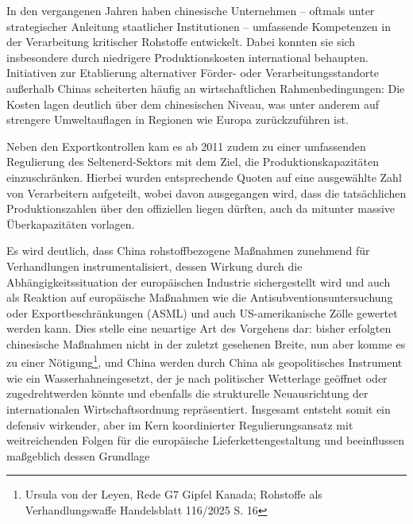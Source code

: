 \documentclass[12pt,a4paper,oneside]{book} %
\begin{document}
In den vergangenen Jahren haben chinesische Unternehmen -- oftmals unter strategischer Anleitung staatlicher Institutionen – umfassende Kompetenzen in der Verarbeitung kritischer Rohstoffe entwickelt. Dabei konnten sie sich insbesondere durch niedrigere Produktionskosten international behaupten. Initiativen zur Etablierung alternativer Förder- oder Verarbeitungsstandorte außerhalb Chinas scheiterten häufig an wirtschaftlichen Rahmenbedingungen: Die Kosten lagen deutlich über dem chinesischen Niveau, was unter anderem auf strengere Umweltauflagen in Regionen wie Europa zurückzuführen ist.

Neben den Exportkontrollen kam es ab 2011 zudem zu einer umfassenden Regulierung des Seltenerd-Sektors mit dem Ziel, die Produktionskapazitäten einzuschränken. Hierbei wurden entsprechende Quoten auf eine ausgewählte Zahl von Verarbeitern aufgeteilt, wobei davon ausgegangen wird, dass die tatsächlichen Produktionszahlen über den offiziellen liegen dürften, auch da mitunter massive Überkapazitäten vorlagen.\autocite{Top Commodity News 57, S. 1ff}


Es wird deutlich, dass China rohstoffbezogene Maßnahmen zunehmend für Verhandlungen instrumentalisiert, dessen Wirkung durch die Abhängigkeitssituation der europäischen Industrie sichergestellt wird und auch als Reaktion auf europäische Maßnahmen wie die Antisubventionsuntersuchung oder Exportbeschränkungen (ASML)  und auch US-amerikanische Zölle gewertet werden kann. Dies stelle eine neuartige Art des Vorgehens dar: bisher erfolgten chinesische Maßnahmen nicht in der zuletzt gesehenen Breite, nun aber komme es zu einer \glqq Nötigung\grqq \footnote{Ursula von der Leyen, Rede G7 Gipfel Kanada; Rohstoffe als Verhandlungswaffe Handelsblatt 116/2025 S. 16}, und China werden durch China als geopolitisches Instrument wie ein \glqq Wasserhahn\grqq eingesetzt, der \glqq je nach politischer Wetterlage geöffnet oder zugedreht\grqq werden könnte und ebenfalls die strukturelle Neuausrichtung der internationalen Wirtschaftsordnung repräsentiert.\autocite{Neckel: Exportkontrolle im geopolitischen Wettstreit(EuZW 2025, 710, 715)} Insgesamt entsteht somit ein defensiv wirkender, aber im Kern koordinierter Regulierungsansatz mit weitreichenden Folgen für die europäische Lieferkettengestaltung und beeinflussen maßgeblich dessen Grundlage
\end{document}
